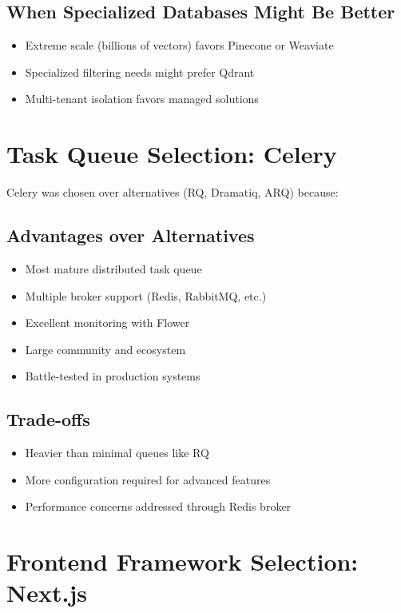 \documentclass[12pt,a4paper]{report}
\begin{document}
\subsection{When Specialized Databases Might Be Better}

\begin{itemize}
    \item Extreme scale (billions of vectors) favors Pinecone or Weaviate
    \item Specialized filtering needs might prefer Qdrant
    \item Multi-tenant isolation favors managed solutions
\end{itemize}

\section{Task Queue Selection: Celery}

Celery was chosen over alternatives (RQ, Dramatiq, ARQ) because:

\subsection{Advantages over Alternatives}

\begin{itemize}
    \item Most mature distributed task queue
    \item Multiple broker support (Redis, RabbitMQ, etc.)
    \item Excellent monitoring with Flower
    \item Large community and ecosystem
    \item Battle-tested in production systems
\end{itemize}

\subsection{Trade-offs}

\begin{itemize}
    \item Heavier than minimal queues like RQ
    \item More configuration required for advanced features
    \item Performance concerns addressed through Redis broker
\end{itemize}

\section{Frontend Framework Selection: Next.js}
\end{document}
